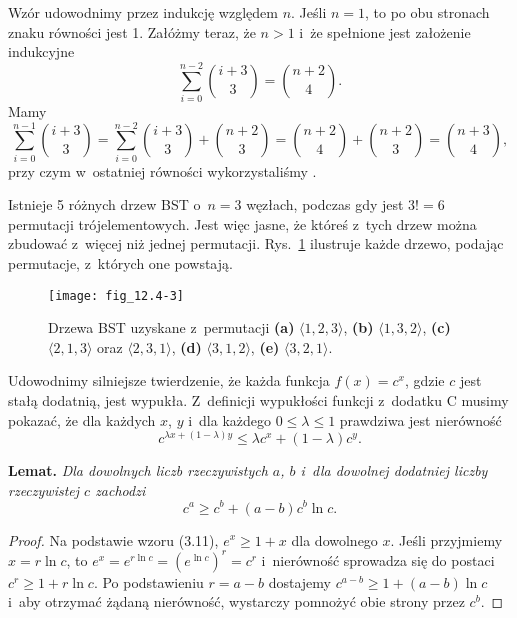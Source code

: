 
\exercise %
Wzór udowodnimy przez indukcję względem $n$.
Jeśli $n=1$, to po obu stronach znaku równości jest 1.
Załóżmy teraz, że $n>1$ i~że spełnione jest założenie indukcyjne
\[
	\sum_{i=0}^{n-2}\binom{i+3}{3} = \binom{n+2}{4}.
\]
Mamy
\[
	\sum_{i=0}^{n-1}\binom{i+3}{3} = \sum_{i=0}^{n-2}\binom{i+3}{3}+\binom{n+2}{3} = \binom{n+2}{4}+\binom{n+2}{3} = \binom{n+3}{4},
\]
przy czym w~ostatniej równości wykorzystaliśmy .

\exercise %
\exercise %
Istnieje 5 różnych drzew BST o~$n=3$ węzłach, podczas gdy jest $3!=6$ permutacji trójelementowych.
Jest więc jasne, że któreś z~tych drzew można zbudować z~więcej niż jednej permutacji.
Rys.~\ref{fig:12.4-3} ilustruje każde drzewo, podając permutacje, z~których one powstają.
\begin{figure}[ht]
	\begin{center}
		\texttt{[image: fig\_12.4-3]}
	\end{center}
	\caption{Drzewa BST uzyskane z~permutacji {\sffamily\bfseries(a)} $\langle1,2,3\rangle$,
{\sffamily\bfseries(b)} $\langle1,3,2\rangle$,
{\sffamily\bfseries(c)} $\langle2,1,3\rangle$ oraz $\langle2,3,1\rangle$, {\sffamily\bfseries(d)} $\langle3,1,2\rangle$, {\sffamily\bfseries(e)} $\langle3,2,1\rangle$.} \label{fig:12.4-3}
\end{figure}

\exercise %
Udowodnimy silniejsze twierdzenie, że każda funkcja $f(x)=c^x$, gdzie $c$ jest stałą dodatnią, jest wypukła.
Z~definicji wypukłości funkcji z~dodatku C musimy pokazać, że dla każdych $x$, $y$ i~dla każdego $0\le\lambda\le1$ prawdziwa jest nierówność
\[
	c^{\lambda x+(1-\lambda)y} \le \lambda c^x+(1-\lambda)c^y.
\]

\medskip
\noindent\textsf{\textbf{Lemat.}} \textit{Dla dowolnych liczb rzeczywistych\/ $a$,\/ $b$ i~dla dowolnej dodatniej liczby rzeczywistej\/ $c$ zachodzi
\[
	c^a \ge c^b+(a-b)c^b\ln c.
\]}
\begin{proof}
Na podstawie wzoru (3.11), $e^x\ge1+x$ dla dowolnego $x$.
Jeśli przyjmiemy $x=r\ln c$, to $e^x=e^{r\ln c}=(e^{\ln c})^r=c^r$ i~nierówność sprowadza się do postaci $c^r\ge1+r\ln c$.
Po podstawieniu $r=a-b$ dostajemy $c^{a-b}\ge1+(a-b)\ln c$ i~aby otrzymać żądaną nierówność, wystarczy pomnożyć obie strony przez $c^b$.
\end{proof}

